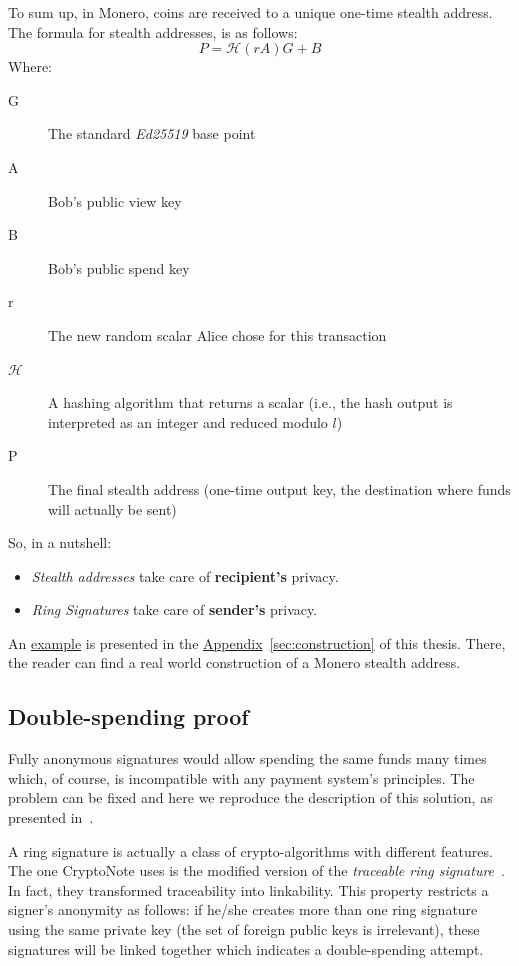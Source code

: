 To sum up, in Monero, coins are received to a unique one-time stealth address. The formula for stealth addresses, is as follows:
\begin{equation}
  P = \mathcal{H}(rA)G + B
\end{equation}
%
Where:
\begin{description}
  \item [G] The standard \emph{Ed25519} base point
  \item [A] Bob's public view key
  \item [B] Bob's public spend key
  \item [r] The new random scalar Alice chose for this transaction
  \item [$\mathcal{H}$] A hashing algorithm that returns a scalar (i.e., the hash output is interpreted as an integer and reduced modulo $l$)
  \item [P] The final stealth address (one-time output key, the destination where funds will actually be sent)
\end{description}
So, in a nutshell:
\begin{itemize}
  \item \emph{Stealth addresses} take care of \textbf{recipient's} privacy.
  \item \emph{Ring Signatures} take care of \textbf{sender's} privacy.
\end{itemize}

An \hyperref[sec:construction]{example} is presented in the \hyperref[sec:construction]{Appendix}~\ref{sec:construction} of this thesis. There, the reader can find a real world construction of a Monero stealth address.
\clearpage
\pagebreak

\subsection{Double-spending proof}
Fully anonymous signatures would allow spending the same funds many times which, of course, is incompatible with any payment system's principles. The problem can be fixed and here we reproduce the description of this solution, as presented in~\cite{cryptonote}.

A ring signature is actually a class of crypto-algorithms with different features. The one CryptoNote uses is the modified version of the \emph{traceable ring signature}~\cite{traceable2}. In fact, they transformed traceability into linkability. This property restricts a signer's anonymity as follows: if he/she creates more than one ring signature using the same private key (the set of foreign public keys is irrelevant), these signatures will be linked together which indicates a double-spending attempt.

